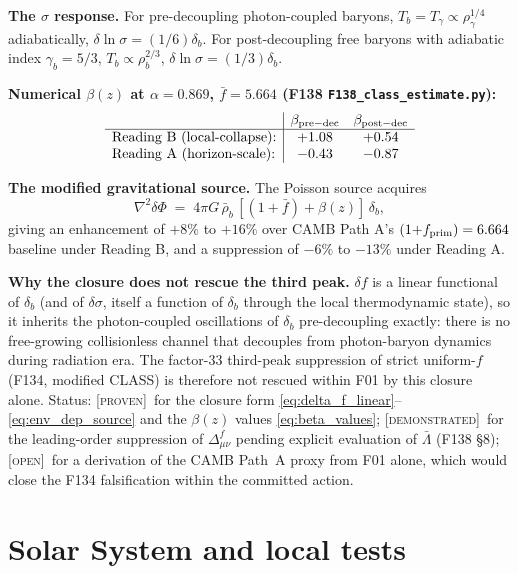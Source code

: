 \documentclass[aps,prd,twocolumn,nofootinbib,floatfix,superscriptaddress]{revtex4-2}
\newcommand{\PROVEN}{{\color{black!75!green}\textsc{[proven]}}}
\newcommand{\DEMO}{{\color{black!70!blue}\textsc{[demonstrated]}}}
\newcommand{\OPEN}{{\color{black!60!red}\textsc{[open]}}}
\newcommand{\fprim}{f_{\rm prim}}
\begin{document}
\textbf{The $\sigma$ response.}
For pre-decoupling photon-coupled baryons, $T_b = T_\gamma \propto
\rho_\gamma^{1/4}$ adiabatically, $\delta\ln\sigma = (1/6)\delta_b$.
For post-decoupling free baryons with adiabatic index $\gamma_b = 5/3$,
$T_b \propto \rho_b^{2/3}$, $\delta\ln\sigma = (1/3)\delta_b$.

\textbf{Numerical $\beta(z)$ at $\alpha = 0.869$, $\bar f = 5.664$
(F138 \texttt{F138\_class\_estimate.py}):}
\begin{equation}
\label{eq:beta_values}
\begin{array}{l|cc}
& \beta_{\rm pre-dec} & \beta_{\rm post-dec} \\
\hline
\text{Reading B (local-collapse):} & +1.08 & +0.54 \\
\text{Reading A (horizon-scale):} & -0.43 & -0.87
\end{array}
\end{equation}

\textbf{The modified gravitational source.}
The Poisson source acquires
\begin{equation}
\label{eq:env_dep_source}
\nabla^2 \delta\Phi \;=\; 4\pi G\,\bar\rho_b\,
[(1{+}\bar f) + \beta(z)]\,\delta_b,
\end{equation}
giving an enhancement of $+8\%$ to $+16\%$ over CAMB Path A's
$(1{+}\fprim) = 6.664$ baseline under Reading B, and a suppression
of $-6\%$ to $-13\%$ under Reading A.

\textbf{Why the closure does not rescue the third peak.}
$\delta f$ is a linear functional of $\delta_b$ (and of $\delta\sigma$,
itself a function of $\delta_b$ through the local thermodynamic
state), so it inherits the photon-coupled oscillations of $\delta_b$
pre-decoupling exactly: there is no free-growing collisionless
channel that decouples from photon-baryon dynamics during radiation
era. The factor-$33$ third-peak suppression of strict uniform-$f$
(F134, modified CLASS) is therefore not rescued within F01 by this
closure alone. Status: \PROVEN\ for the closure form
\eqref{eq:delta_f_linear}--\eqref{eq:env_dep_source} and the
$\beta(z)$ values \eqref{eq:beta_values}; \DEMO\ for the
leading-order suppression of $\Delta^f_{\mu\nu}$ pending explicit
evaluation of $\bar\Lambda$ (F138 §8); \OPEN\ for a derivation of
the CAMB Path~A proxy from F01 alone, which would close the F134
falsification within the committed action.

\section{Solar System and local tests}
\label{sec:solar}
\end{document}
